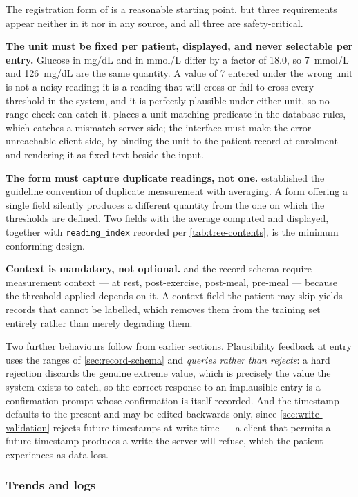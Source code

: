\documentclass[12pt,a4paper,oneside]{report}
\begin{document}
The registration form of \textcite{efendi2025} is a reasonable starting point, but three requirements appear neither in it nor in any source, and all three are safety-critical.

\textbf{The unit must be fixed per patient, displayed, and never selectable per entry.} Glucose in mg/dL and in mmol/L differ by a factor of 18.0, so 7~mmol/L and 126~mg/dL are the same quantity. A value of 7 entered under the wrong unit is not a noisy reading; it is a reading that will cross or fail to cross every threshold in the system, and it is perfectly plausible under either unit, so no range check can catch it.  places a unit-matching predicate in the database rules, which catches a mismatch server-side; the interface must make the error unreachable client-side, by binding the unit to the patient record at enrolment and rendering it as fixed text beside the input.

\textbf{The form must capture duplicate readings, not one.}  established the guideline convention of duplicate measurement with averaging. A form offering a single field silently produces a different quantity from the one on which the thresholds are defined. Two fields with the average computed and displayed, together with \texttt{reading\_index} recorded per \cref{tab:tree-contents}, is the minimum conforming design.

\textbf{Context is mandatory, not optional.}  and the record schema require measurement context --- at rest, post-exercise, post-meal, pre-meal --- because the threshold applied depends on it. A context field the patient may skip yields records that cannot be labelled, which removes them from the training set entirely rather than merely degrading them.

Two further behaviours follow from earlier sections. Plausibility feedback at entry uses the ranges of \cref{sec:record-schema} and \emph{queries rather than rejects}: a hard rejection discards the genuine extreme value, which is precisely the value the system exists to catch, so the correct response to an implausible entry is a confirmation prompt whose confirmation is itself recorded. And the timestamp defaults to the present and may be edited backwards only, since \cref{sec:write-validation} rejects future timestamps at write time --- a client that permits a future timestamp produces a write the server will refuse, which the patient experiences as data loss.

\subsubsection{Trends and logs}\label{sec:trends}
\end{document}
